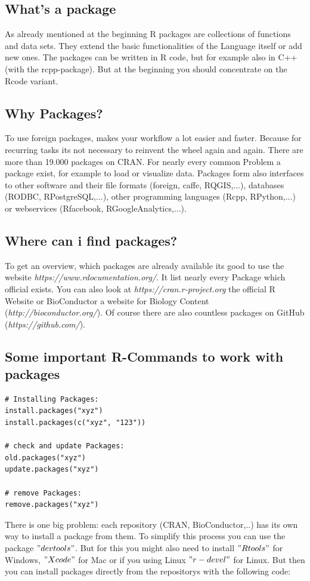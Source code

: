 \documentclass[a4paper,11pt]{article}
\begin{document}
\subsection{What's a package}

As already mentioned at the beginning R packages are collections of functions and data sets. They extend the basic functionalities of the Language itself or add new ones. The packages can be written in R code, but for example also in C++ (with the rcpp-package). But at the beginning you should concentrate on the Rcode variant.

\subsection{Why Packages?}
To use foreign packages, makes your workflow a lot easier and faster. Because for  recurring tasks its not necessary to reinvent the wheel again and again. There are more than 19.000 packages on CRAN. For nearly every common Problem a package exist, for example to load or visualize data. Packages form also interfaces to other software and their file formats (foreign, caffe, RQGIS,...), databases (RODBC, RPostgreSQL,...), other programming languages (Rcpp, RPython,...) or webservices (Rfacebook, RGoogleAnalytics,...).

\subsection{Where can i find packages?}

To get an overview, which packages are already available its good to use the website \textit{https://www.rdocumentation.org/}. It list nearly every Package which official exists. You can also look at \textit{https://cran.r-project.org} the official R Website or  
BioConductor a website for Biology Content (\textit{http://bioconductor.org/}). Of course there are also countless packages on GitHub (\textit{https://github.com/}).

\subsection{Some important R-Commands to work with packages}


\begin{lstlisting}[frame=single]
# Installing Packages:
install.packages("xyz") 
install.packages(c("xyz", "123"))

# check and update Packages:
old.packages("xyz")
update.packages("xyz")

# remove Packages:
remove.packages("xyz")
\end{lstlisting}
There is one big problem: each repository (CRAN, BioConductor,..) has its own way to install a package from them. To simplify this process you can use the package $ "devtools" $. But for this you might also need to install $ "Rtools" $ for Windows, $ "Xcode" $ for Mac or if you using Linux $"r-devel"$ for Linux. But then you can install packages directly from the repositorys with the following code: 
\end{document}

